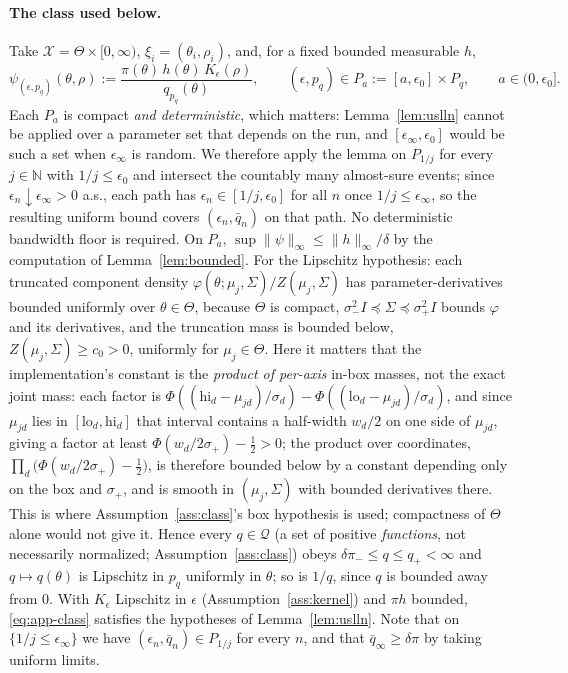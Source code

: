 \documentclass[pdflatex,sn-mathphys-num]{sn-jnl}
\theoremstyle{plain}
\theoremstyle{definition}
\begin{document}
\begin{appendices}
\paragraph{The class used below.} Take $\mathcal{X}=\Theta\times[0,\infty)$, $\xi_i=(\theta_i,\rho_i)$, and, for a fixed bounded measurable $h$,
\begin{equation}
\psi_{(\epsilon,p_q)}(\theta,\rho):=\frac{\pi(\theta)\,h(\theta)\,K_\epsilon(\rho)}{q_{p_q}(\theta)},
\qquad
(\epsilon,p_q)\in P_a:=[a,\epsilon_0]\times P_q,\qquad a\in(0,\epsilon_0] .
\label{eq:app-class}
\end{equation}
Each $P_a$ is compact \emph{and deterministic}, which matters: Lemma~\ref{lem:uslln} cannot be applied over a parameter set that depends on the run, and $[\epsilon_\infty,\epsilon_0]$ would be such a set when $\epsilon_\infty$ is random. We therefore apply the lemma on $P_{1/j}$ for every $j\in\mathbb{N}$ with $1/j\le\epsilon_0$ and intersect the countably many almost-sure events; since $\epsilon_n\downarrow\epsilon_\infty>0$ a.s., each path has $\epsilon_n\in[1/j,\epsilon_0]$ for all $n$ once $1/j\le\epsilon_\infty$, so the resulting uniform bound covers $(\epsilon_n,\bar q_n)$ on that path. No deterministic bandwidth floor is required. On $P_a$, $\sup\|\psi\|_\infty\le\|h\|_\infty/\delta$ by the computation of Lemma~\ref{lem:bounded}. For the Lipschitz hypothesis: each truncated component density $\varphi(\theta;\mu_j,\Sigma)/Z(\mu_j,\Sigma)$ has parameter-derivatives bounded uniformly over $\theta\in\Theta$, because $\Theta$ is compact, $\sigma_-^2I\preceq\Sigma\preceq\sigma_+^2I$ bounds $\varphi$ and its derivatives, and the truncation mass is bounded below, $Z(\mu_j,\Sigma)\ge c_0>0$, uniformly for $\mu_j\in\Theta$. Here it matters that the implementation's constant is the \emph{product of per-axis} in-box masses, not the exact joint mass: each factor is $\Phi((\mathrm{hi}_d-\mu_{jd})/\sigma_d)-\Phi((\mathrm{lo}_d-\mu_{jd})/\sigma_d)$, and since $\mu_{jd}$ lies in $[\mathrm{lo}_d,\mathrm{hi}_d]$ that interval contains a half-width $w_d/2$ on one side of $\mu_{jd}$, giving a factor at least $\Phi(w_d/2\sigma_+)-\tfrac12>0$; the product over coordinates, $\prod_{d}\bigl(\Phi(w_d/2\sigma_+)-\tfrac12\bigr)$, is therefore bounded below by a constant depending only on the box and $\sigma_+$, and is smooth in $(\mu_j,\Sigma)$ with bounded derivatives there. This is where Assumption~\ref{ass:class}'s box hypothesis is used; compactness of $\Theta$ alone would not give it. Hence every $q\in\mathcal{Q}$ (a set of positive \emph{functions}, not necessarily normalized; Assumption~\ref{ass:class}) obeys $\delta\pi_-\le q\le q_+<\infty$ and $q\mapsto q(\theta)$ is Lipschitz in $p_q$ uniformly in $\theta$; so is $1/q$, since $q$ is bounded away from $0$. With $K_\epsilon$ Lipschitz in $\epsilon$ (Assumption~\ref{ass:kernel}) and $\pi h$ bounded, \eqref{eq:app-class} satisfies the hypotheses of Lemma~\ref{lem:uslln}. Note that on $\{1/j\le\epsilon_\infty\}$ we have $(\epsilon_n,\bar q_n)\in P_{1/j}$ for every $n$, and that $\bar q_\infty\ge\delta\pi$ by taking uniform limits.


\end{appendices}
\end{document}
